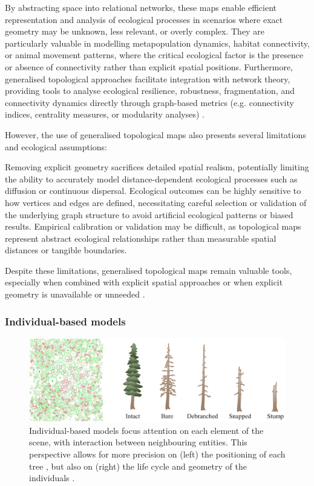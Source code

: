 By abstracting space into relational networks, these maps enable efficient representation and analysis of ecological processes in scenarios where exact geometry may be unknown, less relevant, or overly complex. They are particularly valuable in modelling metapopulation dynamics, habitat connectivity, or animal movement patterns, where the critical ecological factor is the presence or absence of connectivity rather than explicit spatial positions. Furthermore, generalised topological approaches facilitate integration with network theory, providing tools to analyse ecological resilience, robustness, fragmentation, and connectivity dynamics directly through graph-based metrics (e.g. connectivity indices, centrality measures, or modularity analyses) \cite{Lemiere2023,Gaucherel2012}.

However, the use of generalised topological maps also presents several limitations and ecological assumptions:
\begin{Itemize}
\Item{} Removing explicit geometry sacrifices detailed spatial realism, potentially limiting the ability to accurately model distance-dependent ecological processes such as diffusion or continuous dispersal.
\Item{} Ecological outcomes can be highly sensitive to how vertices and edges are defined, necessitating careful selection or validation of the underlying graph structure to avoid artificial ecological patterns or biased results.
\Item{} Empirical calibration or validation may be difficult, as topological maps represent abstract ecological relationships rather than measurable spatial distances or tangible boundaries.
\end{Itemize}

Despite these limitations, generalised topological maps remain valuable tools, especially when combined with explicit spatial approaches \cite{Ecormier-Nocca2021} or when explicit geometry is unavailable or unneeded \cite{Duflot2018,Boussange2022}.

\subsubsection{Individual-based models}

\begin{figure}[H]
\centering
\includegraphics[]{individual-based-modeling-teaser.png}
\caption{Individual-based models focus attention on each element of the scene, with interaction between neighbouring entities. This perspective allows for more precision on (left) the positioning of each tree \cite{Alsweis2006}, but also on (right) the life cycle and geometry of the individuals \cite{Peytavie2024a}.}
\label{fig:env-obj-individual-based-models}
\end{figure}

